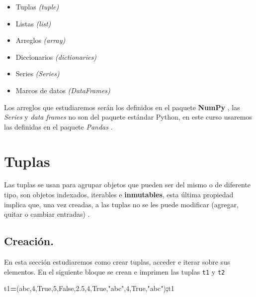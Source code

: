 \documentclass[
]{book}
\newenvironment{Shaded}{\begin{snugshade}}{\end{snugshade}}
\newcommand{\DecValTok}[1]{\textcolor[rgb]{0.00,0.00,0.81}{#1}}
\newcommand{\FloatTok}[1]{\textcolor[rgb]{0.00,0.00,0.81}{#1}}
\newcommand{\NormalTok}[1]{#1}
\newcommand{\OperatorTok}[1]{\textcolor[rgb]{0.81,0.36,0.00}{\textbf{#1}}}
\newcommand{\StringTok}[1]{\textcolor[rgb]{0.31,0.60,0.02}{#1}}
\newcommand{\VariableTok}[1]{\textcolor[rgb]{0.00,0.00,0.00}{#1}}
\providecommand{\tightlist}{%
  \setlength{\itemsep}{0pt}\setlength{\parskip}{0pt}}
\theoremstyle{definition}
\theoremstyle{definition}
\theoremstyle{definition}
\theoremstyle{definition}
\theoremstyle{remark}
\begin{document}
\begin{itemize}
\tightlist
\item
  Tuplas \emph{(tuple)}
\item
  Listas \emph{(list)}
\item
  Arreglos \emph{(array)}
\item
  Diccionarios \emph{(dictionaries)}
\item
  Series \emph{(Series)}\\
\item
  Marcos de datos \emph{(DataFrames)}
\end{itemize}

Los arreglos que estudiaremos serán los definidos en el paquete \textbf{NumPy} \citep{harris2020array}, las \emph{Series} y \emph{data frames} no son del paquete estándar Python, en este curso usaremos las definidas en el paquete \emph{Pandas} \citep{mckinney2010data}.

\hypertarget{sec:tuplas}{%
\section{Tuplas}\label{sec:tuplas}}

Las tuplas se usan para agrupar objetos que pueden ser del mismo o de diferente tipo, son objetos indexados, iterables e \textbf{inmutables}, esta última propiedad implica que, una vez creadas, a las tuplas no se les puede modificar (agregar, quitar o cambiar entradas) .

\hypertarget{creaciuxf3n.}{%
\subsection{Creación.}\label{creaciuxf3n.}}

En esta sección estudiaremos como crear tuplas, acceder e iterar sobre sus elementos. En el siguiente bloque se crean e imprimen las tuplas \texttt{t1} y \texttt{t2}

\begin{Shaded}
\begin{Highlighting}[]
\NormalTok{t1}\OperatorTok{=}\NormalTok{(}\StringTok{\textquotesingle{}abc\textquotesingle{}}\NormalTok{,}\DecValTok{4}\NormalTok{,}\VariableTok{True}\NormalTok{,}\DecValTok{5}\NormalTok{,}\VariableTok{False}\NormalTok{,}\FloatTok{2.5}\NormalTok{,}\DecValTok{4}\NormalTok{,}\VariableTok{True}\NormalTok{,}\StringTok{"abc"}\NormalTok{,}\DecValTok{4}\NormalTok{,}\VariableTok{True}\NormalTok{,}\StringTok{"abc"}\NormalTok{)}\OperatorTok{;}\NormalTok{t1}
\end{Highlighting}
\end{Shaded}
\end{document}
